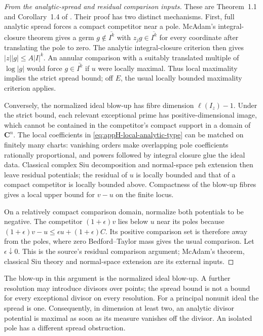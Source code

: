 \begin{proof}[From the analytic-spread and residual comparison inputs]
These are Theorem~1.1 and Corollary~1.4 of
\cite{DoHiep26MaximalityV1}.
Their proof has two distinct mechanisms. First, full analytic spread
forces a compact competitor near a pole. McAdam's integral-closure
theorem \cite{McAdam80AnalyticSpread} gives a germ
\(g\notin\overline{I^k}\) with
\(z_jg\in\overline{I^k}\) for every coordinate after translating
the pole to zero. The analytic integral-closure criterion then gives
\(|z||g|\leq A|I|^k\). An annular comparison with a suitably
translated multiple of \(\log|g|\) would force
\(g\in\overline{I^k}\) if \(u\) were locally maximal. Thus
local maximality implies the strict spread bound; off \(E\),
the usual locally bounded maximality criterion applies.

Conversely, the normalized ideal blow-up has fibre dimension
\(\ell(I_z)-1\). Under the strict bound, each relevant exceptional
prime has positive-dimensional image, which cannot be contained
in the competitor's compact support in a domain of \(\mathbf C^n\).
The local coefficients in \eqref{eq:appH-local-analytic-type}
can be matched on finitely many charts: vanishing orders make
overlapping pole coefficients rationally proportional, and powers
followed by integral closure glue the ideal data. Classical complex
Siu decomposition and normal-space psh extension then leave
residual potentials; the residual of \(u\) is locally bounded
and that of a compact competitor is locally bounded above.
Compactness of the blow-up fibres gives a local upper bound for
\(v-u\) on the finite locus.

On a relatively compact comparison domain, normalize both
potentials to be negative. The competitor \((1+\epsilon)v\)
lies below \(u\) near its poles because
\((1+\epsilon)v-u\leq\epsilon u+(1+\epsilon)C\).
Its positive comparison set is therefore away from the poles,
where zero Bedford--Taylor mass gives the usual comparison.
Let \(\epsilon\downarrow0\). This is the source's residual
comparison argument; McAdam's theorem, classical Siu theory and
normal-space extension are its external inputs.
\end{proof}

The blow-up in this argument is the normalized ideal blow-up.
A further resolution may introduce divisors over points; the spread
bound is not a bound for every exceptional divisor on every resolution.
For a principal nonunit ideal the spread is one. Consequently,
in dimension at least two, an analytic divisor potential is maximal
as soon as its measure vanishes off the divisor. An isolated pole
has a different spread obstruction.


